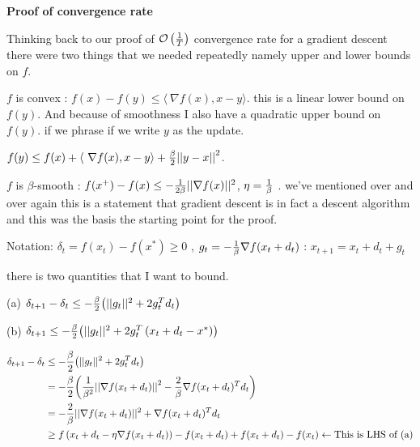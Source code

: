 \documentclass[twoside]{article}
\begin{document}
\textbf{Proof of convergence rate}

Thinking back to our proof of $\mathcal{O}\left({1 \over T}\right)$ convergence rate for a gradient descent there were two things that we needed repeatedly namely upper and lower bounds on $f$.

$f$ is convex : $f(x) - f(y) \leq \langle\ \nabla f(x), x-y\rangle$. this is a linear lower bound on $f(y)$. And because of smoothness I also have a quadratic upper bound on $f(y)$. if we phrase if we write $y$ as the update.

$f(y) \leq f(x) + \langle\ \nabla f(x), x-y\rangle + {\beta \over 2}{||y-x||}^2$. 

$f$ is $\beta$-smooth : $f(x^+) - f(x) \leq - {1\over {2\beta}} ||\nabla f(x)||^2$, $\eta = {1 \over \beta}$ . we've mentioned over and over again this is a statement that gradient descent is in fact a descent algorithm and this was the basis the starting point for the proof.

Notation: $\delta_t = f(x_t) - f(x^*) \geq 0$ , $g_t = -{1 \over \beta}\nabla f(x_t+d_t)$ : $x_{t+1} = x_t +d_t+g_t$

there is two quantities that I want to bound.

(a) $\delta_{t+1} - \delta_{t} \leq -{\beta \over 2}{\left(||g_t||^2 + 2g_t^Td_t\right)}$

(b) $\delta_{t+1} \leq -{\beta \over 2}{\left(||g_t||^2 + 2g_t^T\left(x_t+d_t-x^*\right)\right)}$
\begin{center}

\begin{align*}
\delta_{t+1} - \delta_{t} &\leq -{\beta \over 2}{\left(||g_t||^2 + 2g_t^Td_t\right)} \\
&=  -{\beta \over 2}{\left({1 \over \beta^2}{||\nabla f(x_t+d_t)||}^2 -{2 \over \beta}\nabla f(x_t+d_t)^Td_t\right)} \\
&= -{2 \over \beta}||\nabla f(x_t+d_t)||^2+\nabla f(x_t+d_t)^Td_t \\
&\geq f \left(x_t+d_t-\eta \nabla f(x_t+d_t)\right) -f(x_t+d_t)+f(x_t+d_t) -f(x_t) \leftarrow \text{This is LHS of (a)}\\
\end{align*}
\end{center}
\end{document}
